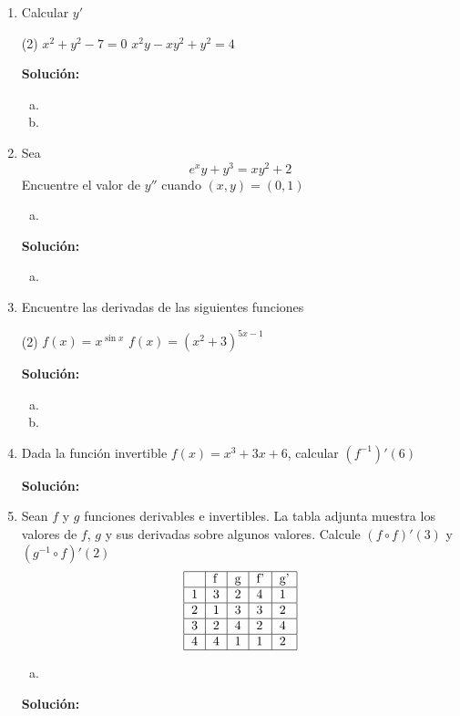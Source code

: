 \documentclass[12pt]{article}
\newenvironment{solucion}
{\begin{mdframed}[backgroundcolor=black!10]
		{\bf Solución:}\\
	}
	{
	\end{mdframed}
}
\newenvironment{preguntas}
{\begin{enumerate}\itemsep12pt
	}
	{
	\end{enumerate}
}
\begin{document}
\begin{preguntas}
\item Calcular $y'$
\begin{tasks}(2)
\task $x^2+y^2-7=0$
\task $x^2y-xy^2+y^2=4$
\end{tasks}
\begin{solucion}

\begin{enumerate}[a)]
\item 
\item 
\end{enumerate}
\end{solucion}
\item Sea
$$e^xy+y^3 =xy^2+2$$
Encuentre el valor de $y''$ cuando $(x,y)=(0,1)$
\begin{enumerate}[a)]
\item 
\end{enumerate}
\begin{solucion}

\begin{enumerate}[a)]
\item 
\end{enumerate}
\end{solucion}
\item Encuentre las derivadas de las siguientes funciones
\begin{tasks}(2)
\task $f(x) = x^{\sin x}$
\task $f(x) = (x^2+3)^{5x-1}$
\end{tasks}
\begin{solucion}

\begin{enumerate}[a)]
\item 
\item 
\end{enumerate}
\end{solucion}
\item Dada la función invertible $f(x) = x^3 + 3x + 6$, calcular $(f^{-1})'(6)$
\begin{solucion}

\end{solucion}
\item Sean $f$ y $g$ funciones derivables e invertibles. La tabla adjunta muestra los valores de $f$, $g$ y sus derivadas sobre algunos valores. Calcule $(f \circ f)'(3)$ y $(g^{-1} \circ f)'(2)$
$$
\begin{tabular}{|l|l|l|l|l|}
\hline
  & f & g & f' & g' \\ \hline
1 & 3 & 2 & 4  & 1  \\ \hline
2 & 1 & 3 & 3  & 2  \\ \hline
3 & 2 & 4 & 2  & 4  \\ \hline
4 & 4 & 1 & 1  & 2  \\ \hline
\end{tabular}
$$
\begin{enumerate}[a)]
\item 
\end{enumerate}
\begin{solucion}


\end{solucion}
\end{preguntas}
\end{document}
